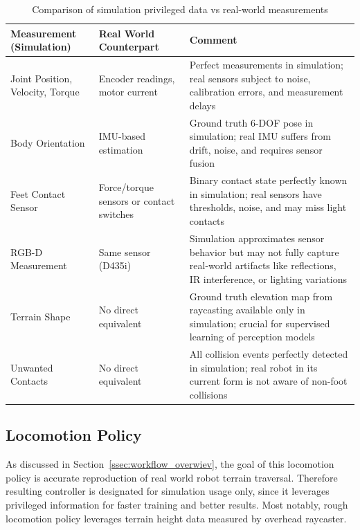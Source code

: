 \begin{table}[H]
\centering
\caption{Comparison of simulation privileged data vs real-world measurements}
\label{tab:sim-vs-real-data}
\renewcommand{\arraystretch}{1.3}
\begin{tabularx}{\textwidth}{|>{\centering\arraybackslash}m{2.5cm}|>{\centering\arraybackslash}m{2.5cm}|>{\centering\arraybackslash}X|}
\hline
\textbf{Measurement (Simulation)} & \textbf{Real World Counterpart} & \textbf{Comment} \\
\hline
Joint Position, Velocity, Torque & Encoder readings, motor current & Perfect measurements in simulation; real sensors subject to noise, calibration errors, and measurement delays \\
\hline
Body Orientation & IMU-based estimation & Ground truth 6-DOF pose in simulation; real IMU suffers from drift, noise, and requires sensor fusion \\
\hline
Feet Contact Sensor & Force/torque sensors or contact switches & Binary contact state perfectly known in simulation; real sensors have thresholds, noise, and may miss light contacts \\
\hline
RGB-D Measurement & Same sensor (D435i) & Simulation approximates sensor behavior but may not fully capture real-world artifacts like reflections, IR interference, or lighting variations \\
\hline
Terrain Shape & No direct equivalent & Ground truth elevation map from raycasting available only in simulation; crucial for supervised learning of perception models \\
\hline
Unwanted Contacts & No direct equivalent & All collision events perfectly detected in simulation; real robot in its current form is not aware of non-foot collisions \\
\hline
\end{tabularx}
\end{table}

\subsection{Locomotion Policy}
As discussed in Section~\ref{ssec:workflow_overwiev}, the goal of this locomotion policy is accurate reproduction of real world robot terrain traversal. Therefore resulting controller is designated for simulation usage only, since it leverages privileged information for faster training and better results. Most notably, rough locomotion policy leverages terrain height data measured by overhead raycaster.


